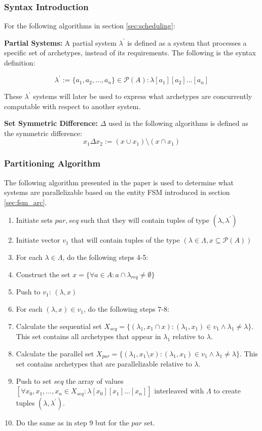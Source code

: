 
\subsubsection{Syntax Introduction}
For the following algorithms in section \ref{sec:scheduling}:

\textbf{Partial Systems:} A partial system $\lambda^\prime$ is defined as a system that processes a specific set of archetypes, instead of its requirements. The following is the syntax definition:

\begin{equation}
    \lambda^\prime := \{a_1,a_2,\ldots,a_n\} \in \mathcal{P}(A) : \lambda[a_1][a_2]\ldots[a_n]
    \label{eq:partial_lambda}
\end{equation}

These $\lambda^\prime$ systems will later be used to express what archetypes are concurrently computable with respect to another system.

\textbf{Set Symmetric Difference:} $\Delta$ used in the following algorithms is defined as the symmetric difference: 
$$x_1 \Delta x_2 := (x \cup x_1) \setminus (x \cap x_1)$$


\subsubsection{Partitioning Algorithm}
\label{alg:part}
The following algorithm presented in the paper is used to determine what systems are parallelizable based on the entity FSM introduced in section \ref{sec:fsm_arc}. 

\begin{enumerate}
    \item Initiate sets $par, seq$ such that they will contain tuples of type $(\lambda, \lambda^\prime)$
    \item Initiate vector $v_1$ that will contain tuples of the type $(\lambda \in \Lambda, x \subseteq \mathcal{P}(A))$
    \item For each $\lambda \in \Lambda$, do the following steps 4-5:
    \item Construct the set $x = \{ \forall a \in A : a \cap \lambda_{req} \not= \emptyset \}$
    \item Push to $v_1$: $(\lambda, x)$
    \item For each $(\lambda, x) \in v_1$, do the following steps 7-8:
    \item Calculate the sequential set $X_{seq} = \{ (\lambda_1, x_1 \cap x ) : (\lambda_1, x_1) \in v_1 \land \lambda_1 \not= \lambda \}$. This set contains all archetypes that appear in $\lambda_1$ relative to $\lambda$.
    \item Calculate the parallel set $X_{par} = \{ (\lambda_1, x_1 \setminus x ) : (\lambda_1, x_1) \in v_1 \land \lambda_1 \not= \lambda \}$. This set contains archetypes that are parallelizable relative to $\lambda$.
    \item Push to set $seq$ the array of values $[\forall x_0,x_1,\ldots,x_n \in X_{seq} : \lambda[x_0][x_1]\ldots[x_n]]$ interleaved with $\Lambda$ to create tuples $(\lambda, \lambda^\prime)$.
    \item Do the same as in step 9 but for the $par$ set.
\end{enumerate}

